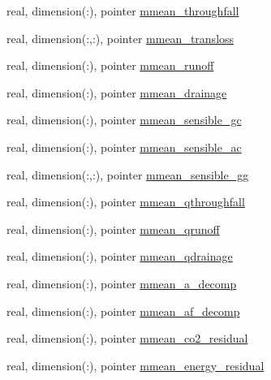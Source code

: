 \begin{DoxyCompactItemize}
\item 
real, dimension(\+:), pointer \hyperlink{structed__state__vars_1_1sitetype_a7e66226533f7f9d3551ff810369cd259}{mmean\+\_\+throughfall}
\item 
real, dimension(\+:,\+:), pointer \hyperlink{structed__state__vars_1_1sitetype_a505fc9ea37f1f7ce0b06b59f5aa2ccad}{mmean\+\_\+transloss}
\item 
real, dimension(\+:), pointer \hyperlink{structed__state__vars_1_1sitetype_a00cd58bd64c5a4ad3d1d552ac0dee6dd}{mmean\+\_\+runoff}
\item 
real, dimension(\+:), pointer \hyperlink{structed__state__vars_1_1sitetype_a9c82e1b55220863d94d79d677537aa99}{mmean\+\_\+drainage}
\item 
real, dimension(\+:), pointer \hyperlink{structed__state__vars_1_1sitetype_accd81f5423a42af67fafff1f07291fcd}{mmean\+\_\+sensible\+\_\+gc}
\item 
real, dimension(\+:), pointer \hyperlink{structed__state__vars_1_1sitetype_ad0d171e89c544a4c0e313f6f77de028a}{mmean\+\_\+sensible\+\_\+ac}
\item 
real, dimension(\+:,\+:), pointer \hyperlink{structed__state__vars_1_1sitetype_a0e3aab7b9d72b833efab8d7197c2d44b}{mmean\+\_\+sensible\+\_\+gg}
\item 
real, dimension(\+:), pointer \hyperlink{structed__state__vars_1_1sitetype_a22e7f94134fe2a765b32d64c3c2d046c}{mmean\+\_\+qthroughfall}
\item 
real, dimension(\+:), pointer \hyperlink{structed__state__vars_1_1sitetype_a02571369acee52acf9d8266427b65277}{mmean\+\_\+qrunoff}
\item 
real, dimension(\+:), pointer \hyperlink{structed__state__vars_1_1sitetype_a32ebf6a402687e3dac6e30369b27a91c}{mmean\+\_\+qdrainage}
\item 
real, dimension(\+:), pointer \hyperlink{structed__state__vars_1_1sitetype_a1f9ddfcfc8fd2931021244d8a79f51db}{mmean\+\_\+a\+\_\+decomp}
\item 
real, dimension(\+:), pointer \hyperlink{structed__state__vars_1_1sitetype_adcf2171188ac5d14a811122f14ecc1c8}{mmean\+\_\+af\+\_\+decomp}
\item 
real, dimension(\+:), pointer \hyperlink{structed__state__vars_1_1sitetype_ad1ed5ac65b992e090102feb37442bf62}{mmean\+\_\+co2\+\_\+residual}
\item 
real, dimension(\+:), pointer \hyperlink{structed__state__vars_1_1sitetype_ad42230f79a29def43355da6d666e4dce}{mmean\+\_\+energy\+\_\+residual}
\item 

\end{DoxyCompactItemize}
